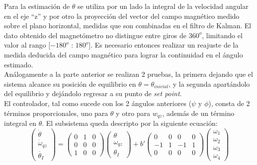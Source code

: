 \documentclass[main]{subfiles}
\begin{document}
Para la estimaci\'on de $\theta$ se utiliza por un lado la integral de la velocidad angular en el eje ``z'' y por otro la proyecci\'on del vector del campo magn\'etico medido sobre el plano horizontal, medidas que son combinadas en el filtro de Kalman. El dato obtenido del magnet\'ometro no distingue entre giros de $360^o$, limitando el valor al rango [$-180^o$ : $180^o$]. Es necesario entonces realizar un reajuste de la medida deducida del campo magn\'etico para lograr la continuidad en el \'angulo estimado.\\

Análogamente a la parte anterior se realizan 2 pruebas, la primera dejando que el sistema alcance su posición de equilibrio en $\theta = \theta_{inicial}$, y la segunda apartándolo del equilibrio y dejándolo regresar a su punto de \emph{set point}.\\

El controlador, tal como sucede con los 2 ángulos anteriores ($\psi$ y $\phi$), consta de 2 términos proporcionales, uno para $\theta$ y otro para $w_{qz}$, además de un término integral en $\theta$. El subsistema queda descripto por la siguiente ecuación:
\begin{equation}
\left(\begin{array}{c}
\dot{\theta}\\
\dot{\omega}_{qz}\\
\dot{\theta_I}
\end{array}\right) = 
\left(\begin{array}{ccc}
0 & 1 & 0\\
0 & 0 & 0\\
1 & 0 & 0
\end{array}\right) 
\left(\begin{array}{c}
{\theta}\\
{\omega}_{qz}\\
{\theta_I}
\end{array}\right)
+ b\prime \left(\begin{array}{cccc}
0  & 0 &  0 & 0 \\
-1 & 1 & -1 & 1 \\
0  & 0 &  0 & 0
\end{array}\right) \left(\begin{array}{c}
\omega_1 \\
\omega_2 \\
\omega_3 \\
\omega_4
\end{array}\right)
\end{equation}
\end{document}
